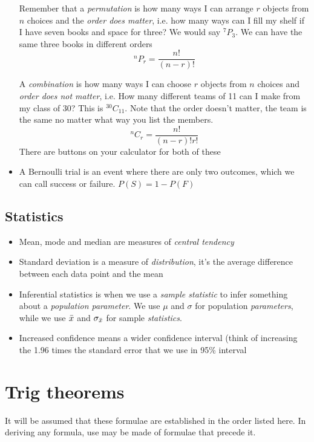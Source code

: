 \documentclass[10pt,a4paper]{article}
\newcommand*{\Perm}[2]{{}^{#1}\!P_{#2}}
\newcommand*{\Comb}[2]{{}^{#1}C_{#2}}
\begin{document}
\begin{itemize}
    Remember that a \textit{permutation} is how many ways I can arrange $r$ objects from $n$ choices and the \textit{order does matter}, i.e. how many ways can I fill my shelf if I have seven books and space for three? We would say $\Perm{7}{3}$. We can have the same three books in different orders
        \begin{equation}
        ^{n}P_{r} = \frac{n!}{(n-r)!}
        \end{equation}
        
    A \textit{combination} is how many ways I can choose $r$ objects from $n$ choices and \textit{order does not matter}, i.e. How many different teams of 11 can I make from my class of 30? This is $\Comb{30}{11}$. Note that the order doesn't matter, the team is the same no matter what way you list the members.
        \begin{equation}
        ^{n}C_{r} = \frac{n!}{(n-r)!r!}
        \end{equation}
    There are buttons on your calculator for both of these
    \item A Bernoulli trial is an event where there are only two outcomes, which we can call success or failure. $P(S)=1-P(F)$
\end{itemize}
    
\subsection{Statistics}
    \begin{itemize}
        \item Mean, mode and median are measures of \textit{central tendency}
        \item Standard deviation is a measure of \textit{distribution}, it's the average difference between each data point and the mean
        \item Inferential statistics is when we use a \textit{sample statistic} to infer something about a \textit{population parameter}. We use $\mu$ and $\sigma$ for population \textit{parameters}, while we use $\Bar{x}$ and $\sigma_{\Bar{x}}$ for sample \textit{statistics}.
        \item Increased confidence means a wider confidence interval (think of increasing the 1.96 times the standard error that we use in 95\% interval
    \end{itemize}


\section{Trig theorems}
It will be assumed that these formulae are established in the order listed here. In deriving any formula, use may be made of formulae that precede it.
\end{document}

